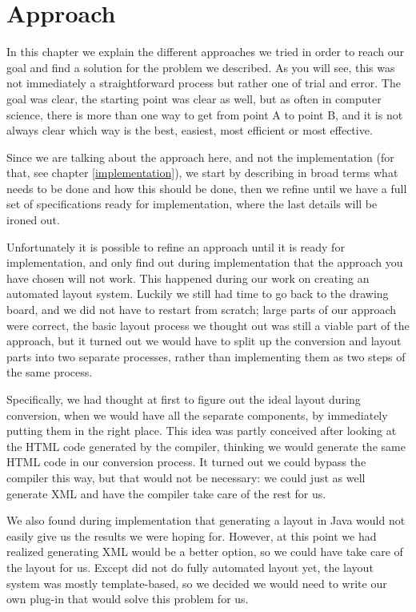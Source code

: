 
 \chapter{Approach}

  In this chapter we explain the different approaches we tried in order to
  reach our goal and find a solution for the problem we described. As you will
  see, this was not immediately a straightforward process but rather one of
  trial and error. The goal was clear, the starting point was clear as well,
  but as often in computer science, there is more than one way to get from
  point A to point B, and it is not always clear which way is the best,
  easiest, most efficient or most effective.
 
  Since we are talking about the approach here, and not the implementation (for
  that, see chapter \ref{implementation}), we start by describing in broad
  terms what needs to be done and how this should be done, then we refine until
  we have a full set of specifications ready for implementation, where the last
  details will be ironed out.

  Unfortunately it is possible to refine an approach until it is ready for
  implementation, and only find out during implementation that the approach
  you have chosen will not work. This happened during our work on creating an
  automated layout system. Luckily we still had time to go back to the drawing
  board, and we did not have to restart from scratch; large parts of our
  approach were correct, the basic layout process we thought out was still a
  viable part of the approach, but it turned out we would have to split up the
  conversion and layout parts into two separate processes, rather than
  implementing them as two steps of the same process.
  
  Specifically, we had thought at first to figure out the ideal layout during
  conversion, when we would have all the separate components, by immediately
  putting them in the right place. This idea was partly conceived after looking
  at the HTML code generated by the \mxp compiler, thinking we would generate
  the same HTML code in our conversion process. It turned out we could bypass
  the \mxp compiler this way, but that would not be necessary: we could just as
  well generate \mxp XML and have the compiler take care of the rest for us.
 
  We also found during implementation that generating a layout in Java would
  not easily give us the results we were hoping for. However, at this point we
  had realized generating \mxp XML would be a better option, so we could have
  \mxp take care of the layout for us. Except \mxp did not do fully automated
  layout yet, the layout system was mostly template-based, so we decided we
  would need to write our own \mxp plug-in that would solve this problem for
  us.

